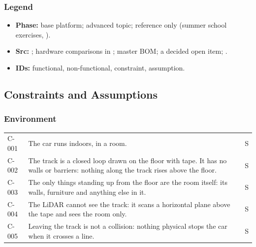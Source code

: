 \documentclass[11pt,a4paper]{article}
\begin{document}
\subsubsection{Legend}
\begin{itemize}
  \item \textbf{Phase:}  base platform;  advanced topic;  reference only (summer school exercises, \tbd[OI-12]).
  \item \textbf{Src:}  ;  hardware comparisons in ;  master BOM;  a decided open item;  .
  \item \textbf{IDs:}  functional,  non-functional,  constraint,  assumption.
\end{itemize}

\subsection{Constraints and Assumptions}
\subsubsection{Environment}
\begin{tabularx}{\textwidth}{K}
\toprule
{} &  &  \\
\midrule
\endhead
C-001 & The car runs indoors, in a room. & S \\
C-002 & The track is a closed loop drawn on the floor with tape. It has no walls or barriers: nothing along the track rises above the floor. & S \\
C-003 & The only things standing up from the floor are the room itself: its walls, furniture and anything else in it. & S \\
C-004 & The LiDAR cannot see the track: it scans a horizontal plane above the tape and sees the room only. & S \\
C-005 & Leaving the track is not a collision: nothing physical stops the car when it crosses a line. & S \\
\bottomrule
\end{tabularx}
\end{document}

